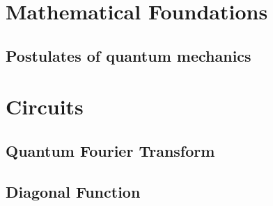 \documentclass[
oneside,
11pt, a4paper,
footinclude=true,
headinclude=true,
cleardoublepage=empty
]{scrbook}
\begin{document}
\chapter{Mathematical Foundations}
\section{Postulates of quantum mechanics}\label{sec:PostulatesQM}

\chapter{Circuits}
\section{Quantum Fourier Transform}\label{sec:chapQFT}

\section{Diagonal Function}
%
\end{document}
